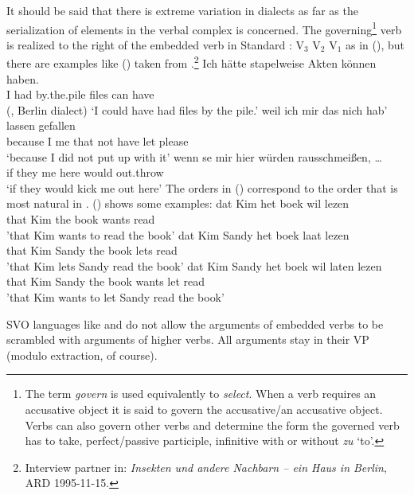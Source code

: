 It should be said that there is extreme variation in  dialects as far as the serialization
of elements in the verbal complex is concerned. The governing\footnote{
  The term \emph{govern} is used equivalently to \emph{select}. When a verb requires an accusative
  object it is said to govern the accusative/an accusative object. Verbs can also govern other verbs
  and determine the form the governed verb has to take, \eg perfect/passive participle, infinitive
  with or without \emph{zu} `to'. 
} verb is realized to the right of the
embedded verb in Standard : V$_3$ V$_2$ V$_1$ as in (), but there are examples like
() taken from .\footnote{
Interview partner in: \emph{Insekten und andere Nachbarn -- ein Haus in Berlin}, ARD 1995-11-15.
}
\eal
\ex 
\gll Ich hätte stapelweise Akten kön\-nen haben.\\
     I   had   by.the.pile files can      have\\\hfill (, Berlin dialect)
\glt `I could have had files by the pile.'
\ex 
\gll weil ich mir das  nich hab' lassen gefallen\\
     because I me that not  have let    please\\
\glt `because I did not put up with it'
\ex 
\gll wenn se   mir hier würden rausschmeißen, \ldots\\
     if   they me  here would  out.throw\\
\glt `if they would kick me out here'
\zl
The orders in () correspond to the order that is most natural in . () shows some
 examples: 
\eal
\ex
\gll dat   Kim het boek wil lezen\\
     that  Kim the book wants read\\
\glt 'that Kim wants to read the book' 
\ex
\gll dat  Kim Sandy het boek laat lezen\\
     that Kim Sandy the book lets read\\
\glt 'that Kim lets Sandy read the book'
\ex 
\gll dat Kim Sandy het boek wil laten lezen\\
     that Kim Sandy the book wants let read \\
\glt 'that Kim wants to let Sandy read the book'
\zl

SVO languages like  and  do not allow the arguments of embedded verbs to be scrambled
with arguments of higher verbs. All arguments stay in their VP (modulo extraction, of course).


